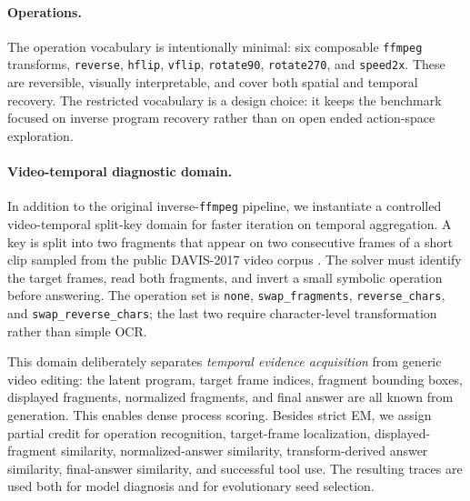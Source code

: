 \paragraph{Operations.}
The operation vocabulary is intentionally minimal: six composable
\texttt{ffmpeg} transforms, \texttt{reverse}, \texttt{hflip},
\texttt{vflip}, \texttt{rotate90}, \texttt{rotate270}, and
\texttt{speed2x}. These are reversible, visually interpretable, and cover both
spatial and temporal recovery. The restricted vocabulary is a design choice:
it keeps the benchmark focused on inverse program recovery rather than on open
ended action-space exploration.

\paragraph{Video-temporal diagnostic domain.}
In addition to the original inverse-\texttt{ffmpeg} pipeline, we instantiate a
controlled video-temporal split-key domain for faster iteration on temporal
aggregation. A key is split into two fragments that appear on two consecutive
frames of a short clip sampled from the public DAVIS-2017 video corpus
\citep{davis2017}. The solver must identify the target frames, read both
fragments, and invert a small symbolic operation before answering. The
operation set is \texttt{none}, \texttt{swap\_fragments},
\texttt{reverse\_chars}, and \texttt{swap\_reverse\_chars}; the last two
require character-level transformation rather than simple OCR.

This domain deliberately separates \emph{temporal evidence acquisition} from
generic video editing: the latent program, target frame indices, fragment
bounding boxes, displayed fragments, normalized fragments, and final answer are
all known from generation. This enables dense process scoring. Besides strict
EM, we assign partial credit for operation recognition, target-frame
localization, displayed-fragment similarity, normalized-answer similarity,
transform-derived answer similarity, final-answer similarity, and successful
tool use. The resulting traces are used both for model diagnosis and for
evolutionary seed selection.
